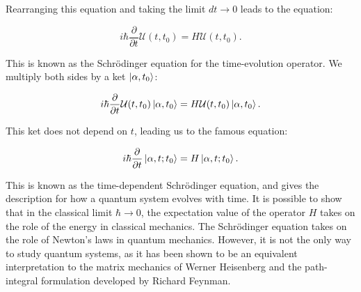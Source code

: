 Rearranging this equation and taking the limit $dt \rightarrow 0$
leads to the equation:

\begin{equation}
 i \hbar \frac{\partial}{\partial t} \mathcal{U}(t, t_0)
    = H \mathcal{U}(t, t_0) .
\end{equation}

This is known as the Schr\"{o}dinger equation for the time-evolution operator.
We multiply both sides by a ket $\ket{\alpha, t_0}$:

\begin{equation}
 i \hbar \frac{\partial}{\partial t} \mathcal{U}(t, t_0)
    \ket{\alpha, t_0} = H \mathcal{U}(t, t_0) \ket{\alpha, t_0} .
\end{equation}

This ket does not depend on $t$, leading us to the famous equation:

\begin{equation}
 i \hbar \frac{\partial}{\partial t}
    \ket{\alpha, t; t_0} = H \ket{\alpha, t; t_0} .
\end{equation}

This is known as the time-dependent Schr\"{o}dinger equation,
and gives the description for how a quantum system evolves with time.
It is possible to show that in the classical limit
$\hbar \rightarrow 0$,
the expectation value of the operator $H$ takes on the
role of the energy in classical mechanics.
The Schr\"{o}dinger equation takes on the role
of Newton's laws in quantum mechanics. However, it is not the only
way to study quantum systems, as it has been shown to be an equivalent
interpretation to the matrix mechanics of Werner Heisenberg
and the path-integral formulation developed by Richard Feynman.
